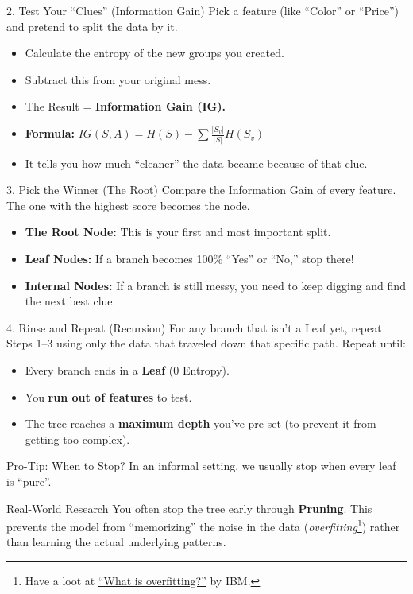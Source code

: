 \documentclass[aspectratio=169]{beamer}
\begin{document}
\begin{frame}{2. Test Your ``Clues'' (Information Gain)}
    Pick a feature (like ``Color'' or ``Price'') and pretend to split the data by it.
    \begin{itemize}
        \item Calculate the entropy of the new groups you created.
        \item Subtract this from your original mess.
        \item The Result = \textbf{Information Gain (IG).}
        \item \textbf{Formula:} $IG(S, A) = H(S) - \sum \frac{|S_v|}{|S|} H(S_v)$
        \item It tells you how much ``cleaner'' the data became because of that clue.
    \end{itemize}
\end{frame}

\begin{frame}{3. Pick the Winner (The Root)}
    Compare the Information Gain of every feature. The one with the highest score becomes the node.
    \begin{itemize}
        \item \textbf{The Root Node:} This is your first and most important split.
        \item \textbf{Leaf Nodes:} If a branch becomes 100\% ``Yes'' or ``No,'' stop there!
        \item \textbf{Internal Nodes:} If a branch is still messy, you need to keep digging and find the next best clue.
    \end{itemize}
\end{frame}

\begin{frame}{4. Rinse and Repeat (Recursion)}
    For any branch that isn't a Leaf yet, repeat Steps 1--3 using only the data that traveled down that specific path.
    \vfill
    Repeat until:
    \begin{itemize}
        \item Every branch ends in a \textbf{Leaf} (0 Entropy).
        \item You \textbf{run out of features} to test.
        \item The tree reaches a \textbf{maximum depth} you've pre-set (to prevent it from getting too complex).
    \end{itemize}
\end{frame}

\begin{frame}{Pro-Tip: When to Stop?}
    In an informal setting, we usually stop when every leaf is ``pure''.
    \vspace{1cm}
    \begin{block}{Real-World Research}
    You often stop the tree early through \textbf{Pruning}. This prevents the model from ``memorizing'' the noise in the data (\textit{overfitting}\footnote{Have a loot at \href{https://tinyurl.com/46axxy39}{``What is overfitting?''} by IBM.}) rather than learning the actual underlying patterns.
    \end{block}
\end{frame}
\end{document}
